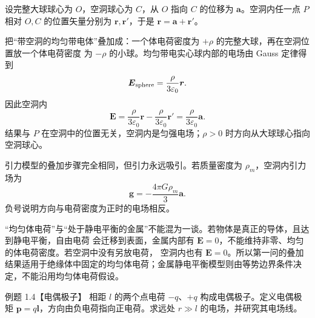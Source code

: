 \begin{xesolution}
设完整大球球心为 $O$，空洞球心为 $C$，从 $O$ 指向 $C$ 的位移为 $\boldsymbol a$。空洞内任一点
$P$ 相对 $O,C$ 的位置矢量分别为 $\boldsymbol r,\boldsymbol r'$，于是
$\boldsymbol r=\boldsymbol a+\boldsymbol r'$。

\cavityFigure

把“带空洞的均匀带电体”叠加成：一个体电荷密度为 $+\rho$ 的完整大球，再在空洞位置放一个体电荷密度
为 $-\rho$ 的小球。均匀带电实心球内部的电场由 Gauss 定律得到
\[
  \boldsymbol E_{\rm sphere}=\frac{\rho}{3\varepsilon_0}\boldsymbol r.
\]
因此空洞内
\[
  \boldsymbol E
  =\frac{\rho}{3\varepsilon_0}\boldsymbol r
  -\frac{\rho}{3\varepsilon_0}\boldsymbol r'
  =\boxed{\frac{\rho}{3\varepsilon_0}\boldsymbol a}.
\]
结果与 $P$ 在空洞中的位置无关，空洞内是匀强电场；$\rho>0$ 时方向从大球球心指向空洞球心。

引力模型的叠加步骤完全相同，但引力永远吸引。若质量密度为 $\rho_m$，空洞内引力场为
\[
  \boxed{\boldsymbol g=-\frac{4\pi G\rho_m}{3}\boldsymbol a}.
\]
负号说明方向与电荷密度为正时的电场相反。

“均匀体电荷”与“处于静电平衡的金属”不能混为一谈。若物体是真正的导体，且达到静电平衡，自由电荷
会迁移到表面，金属内部有 $\boldsymbol E=0$，不能维持非零、均匀的体电荷密度。若空洞中没有另放电荷，
空洞内也有 $\boldsymbol E=0$。所以第一问的叠加结果适用于绝缘体中固定的均匀体电荷；金属静电平衡模型则由等势边界条件决定，不能沿用均匀体电荷假设。
\end{xesolution}

\begin{origexamplebox}{例题 1.4【电偶极子】}
相距 $l$ 的两个点电荷 $-q$、$+q$ 构成电偶极子。定义电偶极矩
$\boldsymbol p=q\boldsymbol l$，方向由负电荷指向正电荷。求远处 $r\gg l$ 的电场，并研究其电场线。
\begin{center}\end{center}
\label{fig:em-source-thirty-second-section-4}
\end{origexamplebox}

